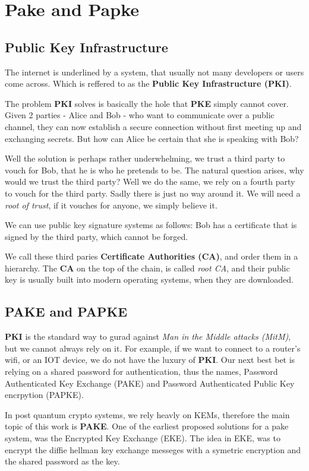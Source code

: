 \chapter{Pake and Papke}

\section{Public Key Infrastructure}

The internet is underlined by a system, that usually not many developers or users come across. Which is reffered to as the \textbf{Public Key Infrastructure (PKI)}.

The problem \textbf{PKI} solves is basically the hole that \textbf{PKE} simply cannot cover. Given 2 parties - Alice and Bob - who want to communicate over a public channel, they can now establish a secure connection without first meeting up and exchanging secrets. But how can Alice be certain that she is speaking with Bob?

Well the solution is perhaps rather underwhelming, we trust a third party to vouch for Bob, that he is who he pretends to be. The natural question arises, why would we trust the third party? Well we do the same, we rely on a fourth party to vouch for the third party. Sadly there is just no way around it. We will need a \emph{root of trust}, if it vouches for anyone, we simply believe it.

We can use public key signature systems as follows: Bob has a certificate that is signed by the third party, which cannot be forged.

We call these third paries \textbf{Certificate Authorities (CA)}, and order them in a hierarchy. The \textbf{CA} on the top of the chain, is called \emph{root CA}, and their public key is usually built into modern operating systems, when they are downloaded.

\section{PAKE and PAPKE}

\textbf{PKI} is the standard way to gurad against \emph{Man in the Middle attacks (MitM)}, but we cannot always rely on it. For example, if we want to connect to a router's wifi, or an IOT device, we do not have the luxury of \textbf{PKI}. Our next best bet is relying on a shared password for authentication, thus the names, Password Authenticated Key Exchange (PAKE) and Password Authenticated Public Key encrpytion (PAPKE).

In post quantum crypto systems, we rely heavly on KEMs, therefore the main topic of this work is \textbf{PAKE}. One of the earliest proposed solutions for a pake system, was the Encrypted Key Exchange (EKE). The idea in EKE, was to encrypt the diffie hellman key exchange messeges with a symetric encryption and the shared password as the key.


